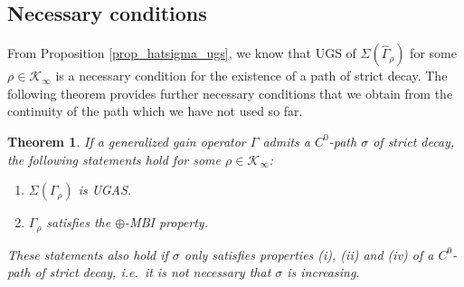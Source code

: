 \documentclass[10pt, oneside, a4paper]{article}
\newcommand{\KC}{\mathcal{K}}
\newtheorem{theorem}{Theorem}[section]
\begin{document}
\subsection{Necessary conditions}\label{subsec_necessary}

From Proposition \ref{prop_hatsigma_ugs}, we know that UGS of $\Sigma(\hat{\Gamma}_{\rho})$ for some $\rho \in \KC_{\infty}$ is a necessary condition for the existence of a path of strict decay. The following theorem provides further necessary conditions that we obtain from the continuity of the path which we have not used so far.%

\begin{theorem}\label{thm_necessary_conditions}
If a generalized gain operator $\Gamma$ admits a $C^0$-path $\sigma$ of strict decay, the following statements hold for some $\rho \in \KC_{\infty}$:%
\begin{enumerate}
\item[(a)] $\Sigma(\Gamma_{\rho})$ is UGAS.%
\item[(b)] $\Gamma_{\rho}$ satisfies the $\oplus$-MBI property.%
\end{enumerate}
These statements also hold if $\sigma$ only satisfies properties (i), (ii) and (iv) of a $C^0$-path of strict decay, i.e.~it is not necessary that $\sigma$ is increasing.
\end{theorem}
\end{document}
